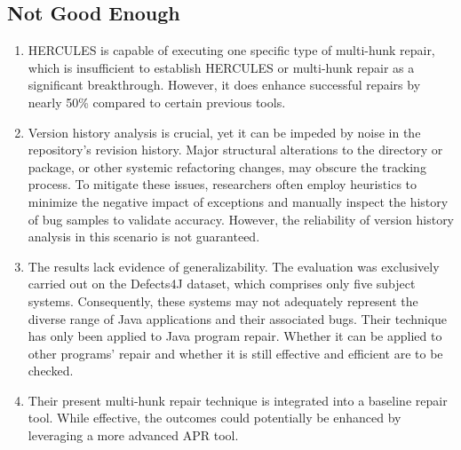 \documentclass[runningheads]{llncs}
\begin{document}
\subsection{Not Good Enough}
\begin{enumerate}
\item HERCULES is capable of executing one specific type of multi-hunk repair, which is insufficient to establish HERCULES or multi-hunk repair as a significant breakthrough. However, it does enhance successful repairs by nearly 50\% compared to certain previous tools.\\
\item Version history analysis is crucial, yet it can be impeded by noise in the repository's revision history. Major structural alterations to the directory or package, or other systemic refactoring changes, may obscure the tracking process. To mitigate these issues, researchers often employ heuristics to minimize the negative impact of exceptions and manually inspect the history of bug samples to validate accuracy. However, the reliability of version history analysis in this scenario is not guaranteed.\\
\item The results lack evidence of generalizability. The evaluation was exclusively carried out on the Defects4J dataset, which comprises only five subject systems. Consequently, these systems may not adequately represent the diverse range of Java applications and their associated bugs. Their technique has only been applied to Java program repair. Whether it can be applied to other programs’ repair and whether it is still effective and efficient are to be checked.\\
\item Their present multi-hunk repair technique is integrated into a baseline repair tool. While effective, the outcomes could potentially be enhanced by leveraging a more advanced APR tool.
\end{enumerate}
\end{document}
